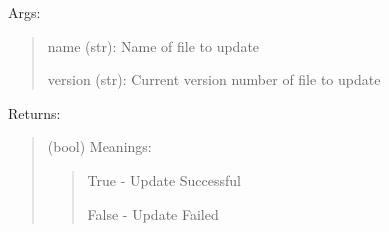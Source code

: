 \documentclass[letterpaper,10pt,english]{sphinxmanual}
\begin{document}
\begin{fulllineitems}
\begin{fulllineitems}
Args:
\begin{quote}

name (str): Name of file to update

version (str): Current version number of file to update
\end{quote}

Returns:
\begin{quote}

(bool) Meanings:
\begin{quote}

True - Update Successful

False - Update Failed
\end{quote}
\end{quote}

\end{fulllineitems}


\end{fulllineitems}

\label{api:module-pyi_updater.client.updates}
\end{document}
